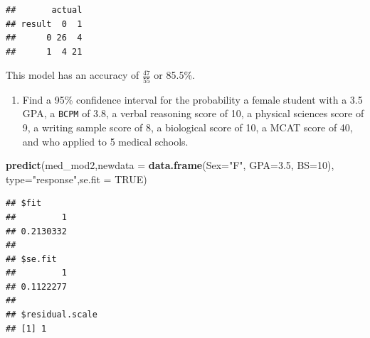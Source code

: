 \documentclass[
]{book}
\newenvironment{Shaded}{\begin{snugshade}}{\end{snugshade}}
\newcommand{\DataTypeTok}[1]{\textcolor[rgb]{0.13,0.29,0.53}{#1}}
\newcommand{\DecValTok}[1]{\textcolor[rgb]{0.00,0.00,0.81}{#1}}
\newcommand{\FloatTok}[1]{\textcolor[rgb]{0.00,0.00,0.81}{#1}}
\newcommand{\KeywordTok}[1]{\textcolor[rgb]{0.13,0.29,0.53}{\textbf{#1}}}
\newcommand{\NormalTok}[1]{#1}
\newcommand{\OperatorTok}[1]{\textcolor[rgb]{0.81,0.36,0.00}{\textbf{#1}}}
\newcommand{\OtherTok}[1]{\textcolor[rgb]{0.56,0.35,0.01}{#1}}
\newcommand{\StringTok}[1]{\textcolor[rgb]{0.31,0.60,0.02}{#1}}
\providecommand{\tightlist}{%
  \setlength{\itemsep}{0pt}\setlength{\parskip}{0pt}}
\begin{document}
\begin{Shaded}
\end{Shaded}

\begin{verbatim}
##       actual
## result  0  1
##      0 26  4
##      1  4 21
\end{verbatim}

This model has an accuracy of \(\frac{47}{55}\) or 85.5\%.

\begin{enumerate}
\def\labelenumi{\alph{enumi}.}
\setcounter{enumi}{5}
\tightlist
\item
  Find a 95\% confidence interval for the probability a female student with a 3.5 GPA, a \texttt{BCPM} of 3.8, a verbal reasoning score of 10, a physical sciences score of 9, a writing sample score of 8, a biological score of 10, a MCAT score of 40, and who applied to 5 medical schools.
\end{enumerate}

\begin{Shaded}
\begin{Highlighting}[]
\KeywordTok{predict}\NormalTok{(med_mod2,}\DataTypeTok{newdata =} \KeywordTok{data.frame}\NormalTok{(}\DataTypeTok{Sex=}\StringTok{"F"}\NormalTok{,}
                                      \DataTypeTok{GPA=}\FloatTok{3.5}\NormalTok{,}
                                      \DataTypeTok{BS=}\DecValTok{10}\NormalTok{),}
        \DataTypeTok{type=}\StringTok{"response"}\NormalTok{,}\DataTypeTok{se.fit =} \OtherTok{TRUE}\NormalTok{)}
\end{Highlighting}
\end{Shaded}

\begin{verbatim}
## $fit
##         1 
## 0.2130332 
## 
## $se.fit
##         1 
## 0.1122277 
## 
## $residual.scale
## [1] 1
\end{verbatim}
\end{document}
